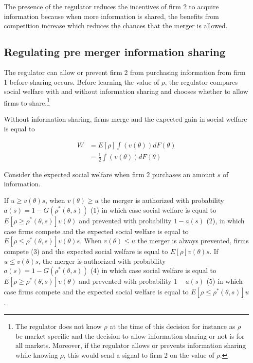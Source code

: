 \documentclass[a4paper,leqno]{article}%
\renewcommand{\t}{\theta}
\begin{document}
\medskip 

The presence of the regulator reduces the incentives of firm 2 to acquire information because when more information is shared, the benefits from competition increase which reduces the chances that the merger is allowed.

\medskip

\subsection{Regulating pre merger information sharing}

The regulator can allow or prevent firm 2 from purchasing information from firm 1 before sharing occurs. Before learning the value of $\rho$, the regulator compares social welfare with and without information sharing and chooses whether to allow firms to share.\footnote{The regulator does not know $\rho$ at the time of this decision for instance as $\rho$ be market specific and the decision to allow information sharing or not is for all markets. Moreover, if the regulator allows or prevents information sharing while knowing $\rho$, this would send a signal to firm 2 on the value of $\rho$.}

Without information sharing, firms merge and the expected gain in social welfare is equal to 

\begin{equation}
    \begin{aligned}
    W&=E[\rho]\int(v(\t))dF(\t)\\
    &=\frac{1}{2}\int(v(\t))dF(\t)
    \end{aligned}
\end{equation}

Consider the expected social welfare when firm 2 purchases an amount $s$ of information.

If $u\geq v(\t)s$, when $v(\t)\geq u$ the merger is authorized with probability $a(s)=1-G(\rho^*(\t,s))$ (1) in which case social welfare is equal to $E[\rho\geq \rho^*(\t,s)]v(\t)$ and prevented with probability $1-a(s)$ (2), in which case firms compete and the expected social welfare is equal to $E[\rho\leq \rho^*(\t,s)]v(\t)s$. When $v(\t)\leq u$ the merger is always prevented, firms compete (3) and the expected social welfare is equal to $E[\rho]v(\t)s$.
If $u\leq v(\t)s$, the merger is authorized with probability $a(s)=1-G(\rho^*(\t,s))$ (4) in which case social welfare is equal to $E[\rho\geq \rho^*(\t,s)]v(\t)$ and prevented with probability $1-a(s)$ (5) in which case firms compete and the expected social welfare is equal to $E[\rho\leq \rho^*(\t,s)]u$.
\end{document}
